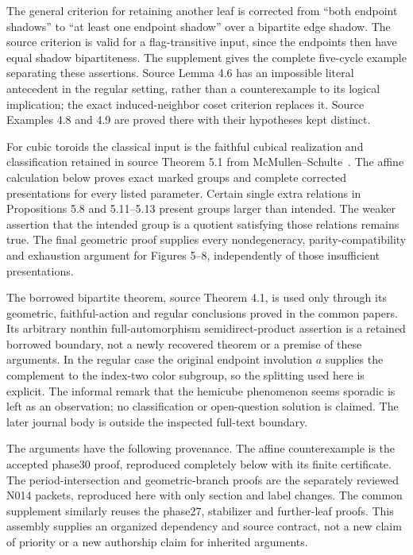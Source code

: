 The general criterion for retaining another leaf is corrected from
``both endpoint shadows'' to ``at least one endpoint shadow'' over a
bipartite edge shadow. The source criterion is valid for a
flag-transitive input, since the endpoints then have equal shadow
bipartiteness. The supplement gives the complete five-cycle example
separating these assertions. Source Lemma 4.6 has an impossible literal
antecedent in the regular setting, rather than a counterexample to its
logical implication; the exact induced-neighbor coset criterion replaces
it. Source Examples 4.8 and 4.9 are proved there with their hypotheses
kept distinct.

For cubic toroids the classical input is the faithful cubical
realization and classification retained in source Theorem 5.1 from
McMullen--Schulte~\cite{MS}. The affine calculation below proves exact
marked groups and complete corrected presentations for every listed
parameter. Certain single extra relations in Propositions 5.8 and
5.11--5.13 present groups larger than intended. The weaker assertion
that the intended group is a quotient satisfying those relations
remains true. The final geometric proof supplies every nondegeneracy,
parity-compatibility and exhaustion argument for Figures 5--8,
independently of those insufficient presentations.

The borrowed bipartite theorem, source Theorem 4.1, is used only through
its geometric, faithful-action and regular conclusions proved in the
common papers. Its arbitrary nonthin full-automorphism semidirect-product
assertion is a retained borrowed boundary, not a newly recovered theorem
or a premise of these arguments. In the regular case the original
endpoint involution $a$ supplies the complement to the index-two color
subgroup, so the splitting used here is explicit. The informal remark
that the hemicube phenomenon seems sporadic is left as an observation;
no classification or open-question solution is claimed. The later
journal body is outside the inspected full-text boundary.

The arguments have the following provenance. The affine counterexample
is the accepted phase30 proof, reproduced completely below with its
finite certificate. The period-intersection and geometric-branch
proofs are the separately reviewed N014 packets, reproduced here with
only section and label changes. The common supplement similarly reuses
the phase27, stabilizer and further-leaf proofs. This assembly supplies
an organized dependency and source contract, not a new claim of priority
or a new authorship claim for inherited arguments.







